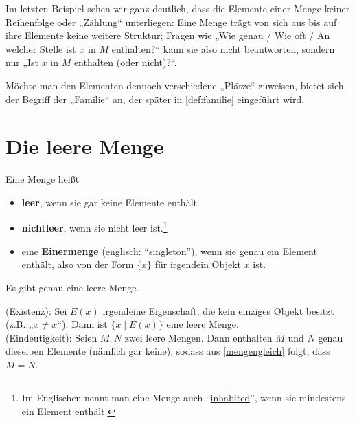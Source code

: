 \begin{bem} \label{mengenstrukturlos}
    Im letzten Beispiel sehen wir ganz deutlich, dass die Elemente einer Menge keiner Reihenfolge oder „Zählung“ unterliegen: Eine Menge trägt von sich aus bis auf ihre Elemente keine weitere Struktur; Fragen wie „Wie genau / Wie oft / An welcher Stelle ist $x$ in $M$ enthalten?“ kann sie also nicht beantworten, sondern nur „Ist $x$ in $M$ enthalten (oder nicht)?“.
    
    Möchte man den Elementen dennoch verschiedene „Plätze“ zuweisen, bietet sich der Begriff der „Familie“ an, der später in \cref{def:familie} eingeführt wird.
\end{bem}





\section{Die leere Menge}


\begin{de}  
    Eine Menge heißt
    \begin{itemize}
        \item \textbf{leer}, wenn sie gar keine Elemente enthält.
        \item \textbf{nichtleer}, wenn sie nicht leer ist.\footnote{Im Englischen nennt man eine Menge auch ``\href{https://en.wikipedia.org/wiki/Inhabited_set}{inhabited}'', wenn sie mindestens ein Element enthält.}
        \item eine \textbf{Einermenge} (englisch: ``singleton''), wenn sie genau ein Element enthält, also von der Form $\{x\}$ für irgendein Objekt $x$ ist.
    \end{itemize}
\end{de}


\begin{satz} \label{leeremengeeind}
    Es gibt genau eine leere Menge.
\end{satz}


\begin{bew}
    (Existenz): Sei $E(x)$ irgendeine Eigenschaft, die kein einziges Objekt besitzt (z.B. „$x\neq x$“). Dann ist $\{ x\mid E(x) \}$ eine leere Menge. \\[0.5em]
    (Eindeutigkeit): Seien $M,N$ zwei leere Mengen. Dann enthalten $M$ und $N$ genau dieselben Elemente (nämlich gar keine), sodass aus \cref{mengengleich} folgt, dass $M=N$.
\end{bew}


